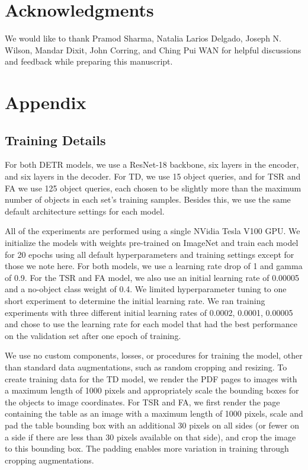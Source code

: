 \documentclass[10pt,twocolumn,letterpaper]{article}
\begin{document}
\section{Acknowledgments}
We would like to thank Pramod Sharma, Natalia Larios Delgado, Joseph N. Wilson, Mandar Dixit, John Corring, and Ching Pui WAN for helpful discussions and feedback while preparing this manuscript.

{\small


}

\section{Appendix}

\subsection{Training Details}

For both DETR models, we use a ResNet-18 backbone, six layers in the encoder, and six layers in the decoder.
For TD, we use 15 object queries, and for TSR and FA we use 125 object queries, each chosen to be slightly more than the maximum number of objects in each set's training samples.
Besides this, we use the same default architecture settings for each model.

All of the experiments are performed using a single NVidia Tesla V100 GPU.
We initialize the models with weights pre-trained on ImageNet and train each model for 20 epochs using all default hyperparameters and training settings except for those we note here.
For both models, we use a learning rate drop of 1 and gamma of 0.9.
For the TSR and FA model, we also use an initial learning rate of 0.00005 and a no-object class weight of 0.4.
We limited hyperparameter tuning to one short experiment to determine the initial learning rate. 
We ran training experiments with three different initial learning rates of 0.0002, 0.0001, 0.00005 and chose to use the learning rate for each model that had the best performance on the validation set after one epoch of training.

We use no custom components, losses, or procedures for training the model, other than standard data augmentations, such as random cropping and resizing.
To create training data for the TD model, we render the PDF pages to images with a maximum length of 1000 pixels and appropriately scale the bounding boxes for the objects to image coordinates.
For TSR and FA, we first render the page containing the table as an image with a maximum length of 1000 pixels, scale and pad the table bounding box with an additional 30 pixels on all sides (or fewer on a side if there are less than 30 pixels available on that side), and crop the image to this bounding box.
The padding enables more variation in training through cropping augmentations.
\end{document}
